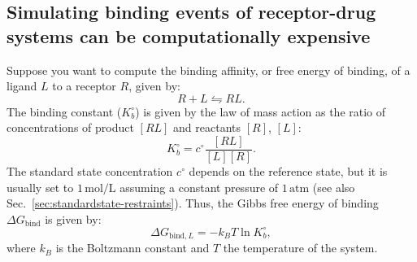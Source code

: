 \documentclass[9pt,bestpractices]{livecoms}
\begin{document}
\subsection{Simulating binding events of receptor-drug systems can be computationally expensive}
Suppose you want to compute the binding affinity, or free energy of binding, of a ligand $L$ to a receptor $R$, given by:
\begin{equation}
R+L \leftrightharpoons RL.
\end{equation}
The binding constant ($K_b^{\circ}$) is given by the law of mass action as the ratio of concentrations of product $[RL]$ and reactants $[R]$, $[L]$:
\begin{equation}
 K_b^{\circ} = c^{\circ}\frac{[RL]}{[L][R]}.
\end{equation}
The standard state concentration $c^\circ$ depends on the reference state, but it is usually set to $1\,\mathrm{mol}/\mathrm{L}$ assuming a constant pressure of $1\,\mathrm{atm}$ (see also Sec.~\ref{sec:standardstate-restraints}).
Thus, the Gibbs free energy of binding $\Delta G_{\mathrm{bind}}$ is given by:
\begin{equation}
    \Delta G_{\mathrm{bind},L} = -k_BT\ln K_b^{\circ},
\end{equation}
where $k_B$ is the Boltzmann constant and $T$ the temperature of the system.
\end{document}
